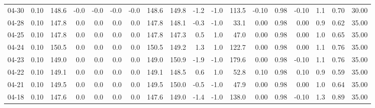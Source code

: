 \begin{threeparttable}
{\begin{tabular}{lrrrrrrrrrrrrrrrrr}
  04-30 &     0.10 & 148.6 &              -0.0 &              -0.0 &               -0.0 &               -0.0 & 148.6 & 149.8 &       -1.2 &                     -1.0 &               113.5 &      -0.10 &      0.98 &          -0.10 &              1.1 &            0.70 &                  30.00 \\
  04-28 &     0.10 & 147.8 &               0.0 &               0.0 &                0.0 &                0.0 & 147.8 & 148.1 &       -0.3 &                     -1.0 &                33.1 &       0.00 &      0.98 &           0.00 &              0.9 &            0.62 &                  35.00 \\
  04-25 &     0.10 & 147.8 &               0.0 &               0.0 &                0.0 &                0.0 & 147.8 & 147.3 &        0.5 &                      1.0 &                47.0 &       0.00 &      0.98 &           0.00 &              1.0 &            0.65 &                  35.00 \\
  04-24 &     0.10 & 150.5 &               0.0 &               0.0 &                0.0 &                0.0 & 150.5 & 149.2 &        1.3 &                      1.0 &               122.7 &       0.00 &      0.98 &           0.00 &              1.1 &            0.76 &                  35.00 \\
  04-23 &     0.10 & 149.0 &               0.0 &               0.0 &                0.0 &                0.0 & 149.0 & 150.9 &       -1.9 &                     -1.0 &               179.6 &       0.00 &      0.98 &          -0.10 &              1.1 &            0.76 &                  35.00 \\
  04-22 &     0.10 & 149.1 &               0.0 &               0.0 &                0.0 &                0.0 & 149.1 & 148.5 &        0.6 &                      1.0 &                52.8 &       0.10 &      0.98 &           0.10 &              0.9 &            0.59 &                  35.00 \\
  04-21 &     0.10 & 149.5 &               0.0 &               0.0 &                0.0 &                0.0 & 149.5 & 150.0 &       -0.5 &                     -1.0 &                47.9 &       0.00 &      0.98 &           0.00 &              1.0 &            0.64 &                  35.00 \\
  04-18 &     0.10 & 147.6 &               0.0 &               0.0 &                0.0 &                0.0 & 147.6 & 149.0 &       -1.4 &                     -1.0 &               138.0 &       0.00 &      0.98 &          -0.10 &              1.3 &            0.89 &                  35.00 \\

\end{tabular}}
\end{threeparttable}
